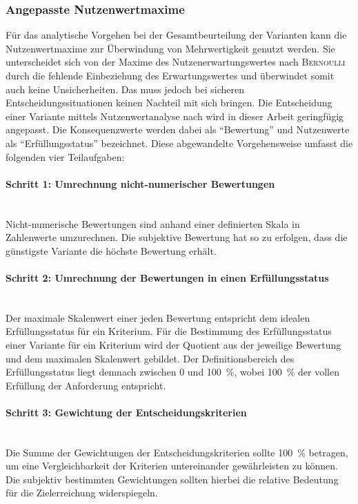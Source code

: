 \subsubsection{Angepasste Nutzenwertmaxime}
Für das analytische Vorgehen bei der Gesamtbeurteilung der Varianten kann die Nutzenwertmaxime zur Überwindung von Mehrwertigkeit genutzt werden. Sie unterscheidet sich von der Maxime des Nutzenerwartungswertes nach \textsc{Bernoulli} durch die fehlende Einbeziehung des Erwartungswertes und überwindet somit auch keine Unsicherheiten. Das muss jedoch bei sicheren Entscheidungssituationen keinen Nachteil mit sich bringen. Die Entscheidung einer Variante mittels Nutzenwertanalyse nach \cite{Grunig.2013} wird in dieser Arbeit geringfügig angepasst. Die Konsequenzwerte werden dabei als "`Bewertung"' und Nutzenwerte als "`Erfüllungsstatus"' bezeichnet. Diese abgewandelte Vorgehensweise umfasst die folgenden vier Teilaufgaben: 
\vspace*{-2.5mm}
\paragraph{Schritt 1: Umrechnung nicht-numerischer Bewertungen}	\, \\
Nicht-numerische Bewertungen sind anhand einer definierten Skala in Zahlenwerte umzurechnen. Die subjektive Bewertung hat so zu erfolgen, dass die günstigste Variante die höchste Bewertung erhält.
\vspace*{-2.5mm}
\paragraph{Schritt 2: Umrechnung der Bewertungen in einen Erfüllungsstatus} \, \\ 
Der maximale Skalenwert einer jeden Bewertung entspricht dem idealen Erfüllungsstatus für ein Kriterium. Für die Bestimmung des Erfüllungsstatus einer Variante für ein Kriterium wird der Quotient aus der jeweilige Bewertung und dem maximalen Skalenwert gebildet. Der Definitionsbereich des Erfüllungsstatus liegt demnach zwischen $0$ und \SI{100}{\percent}, wobei \SI{100}{\percent} der vollen Erfüllung der Anforderung entspricht.
\vspace*{-2.5mm}
\paragraph{Schritt 3: Gewichtung der Entscheidungskriterien} \, \\
Die Summe der Gewichtungen der Entscheidungskriterien sollte \SI{100}{\percent} betragen, um eine Vergleichbarkeit der Kriterien untereinander gewährleisten zu können. Die subjektiv bestimmten Gewichtungen sollten hierbei die relative Bedeutung für die Zielerreichung widerspiegeln.
\vspace*{-7.5mm}
